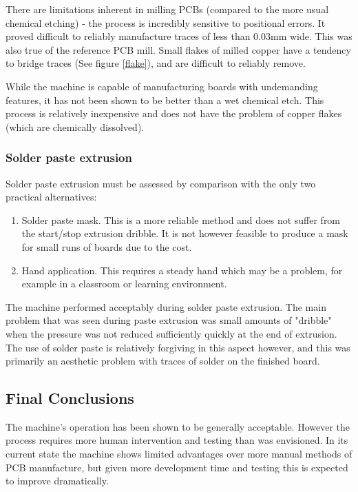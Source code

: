 There are limitations inherent in milling PCBs (compared to the more
usual chemical etching) - the process is incredibly sensitive to positional
errors. It proved difficult to reliably manufacture traces of less than 0.03mm
wide. This was also true of the reference PCB mill. Small flakes of milled
copper have a tendency to bridge traces (See figure \ref{flake}), and are difficult to reliably remove.

While the machine is capable of manufacturing boards with undemanding
features, it has not been shown to be better than a wet chemical etch.
This process is relatively inexpensive and does not have the problem of 
copper flakes (which are chemically dissolved).

\subsubsection{Solder paste extrusion}
Solder paste extrusion must be assessed by comparison with the only two
practical alternatives:

\begin{enumerate}
\item
Solder paste mask. This is a more reliable method and does not suffer from
the start/stop extrusion dribble. It is not however feasible to produce
a mask for small runs of boards due to the cost. 

\item
Hand application. This requires a steady hand which may be a problem, for
example in a classroom or learning environment.
\end{enumerate}

The machine performed acceptably during solder paste extrusion. The 
main problem that was seen during paste extrusion was small amounts of "dribble"
when the pressure was not reduced sufficiently quickly at the end of extrusion.
The use of solder paste is relatively forgiving in this aspect however, and
this was primarily an aesthetic problem with traces of solder on the finished
board.

\subsection{Final Conclusions}
The machine's operation has been shown to be generally acceptable. However
the process requires more human intervention and testing than was envisioned.
In its current state the machine shows limited advantages over
more manual methods of PCB manufacture, but given more development time
and testing this is expected to improve dramatically.

